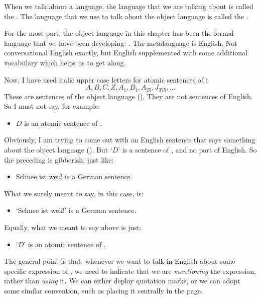When we talk about a language, the language that we are talking about is called the . The language that we use to talk about the object language is called the .
\label{def.metalanguage}

For the most part, the object language in this chapter has been the formal language that we have been developing: \TFL. The metalanguage is English. Not conversational English exactly, but English supplemented with some additional vocabulary which helps us to get along.

Now, I have used italic upper case letters for atomic sentences of \TFL:
	$$A, B, C, Z, A_1, B_4, A_{25}, J_{375},…$$
These are sentences of the object language (\TFL). They are not sentences of English. So I must not say, for example:
	\begin{itemize}
		\item $D$ is an atomic sentence of \TFL.
	\end{itemize}
Obviously, I am trying to come out with an English sentence that says something about the object language (\TFL). But `$D$' is a sentence of \TFL, and no part of English. So the preceding is gibberish, just like:
	\begin{itemize}
		\item Schnee ist weiß is a German sentence.
	\end{itemize}
What we surely meant to say, in this case, is:
	\begin{itemize}
		\item `Schnee ist weiß' is a German sentence.
	\end{itemize}
Equally, what we meant to say above is just:
	\begin{itemize}
		\item `$D$' is an atomic sentence of \TFL.
	\end{itemize}
The general point is that, whenever we want to talk in English about some specific expression of \TFL, we need to indicate that we are \emph{mentioning} the expression, rather than \emph{using} it. We can either deploy quotation marks, or we can adopt some similar convention, such as placing it centrally in the page. 

